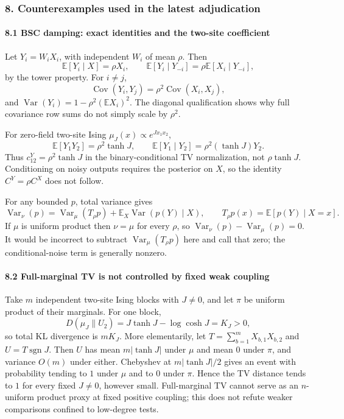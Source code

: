 \subsubsection{8. Counterexamples used in the latest adjudication}\label{counterexamples-used-in-the-latest-adjudication}

\paragraph{8.1 BSC damping: exact identities and the two-site coefficient}\label{bsc-damping-exact-identities-and-the-two-site-coefficient}

Let \(Y_i=W_iX_i\), with independent \(W_i\) of mean \(\rho\). Then
\[\mathbb E[Y_i\mid X]=\rho X_i,\qquad
\mathbb E[Y_i\mid Y_{-i}]=\rho\mathbb E[X_i\mid Y_{-i}],\]
by the tower property. For \(i\ne j\),
\[\operatorname{Cov}(Y_i,Y_j)=\rho^2\operatorname{Cov}(X_i,X_j),\]
and \(\operatorname{Var}(Y_i)=1-\rho^2(\mathbb E X_i)^2\). The diagonal qualification shows why full covariance row sums do not simply scale by \(\rho^2\).

For zero-field two-site Ising \(\mu_J(x)\propto e^{Jx_1x_2}\),
\[\mathbb E[Y_1Y_2]=\rho^2\tanh J,
\qquad \mathbb E[Y_1\mid Y_2]=\rho^2(\tanh J)Y_2.\]
Thus \(c_{12}^Y=\rho^2\tanh J\) in the binary-conditional TV normalization, not \(\rho\tanh J\). Conditioning on noisy outputs requires the posterior on \(X\), so the identity \(C^Y=\rho C^X\) does not follow.

For any bounded \(p\), total variance gives
\[\operatorname{Var}_\nu(p)=\operatorname{Var}_\mu(T_\rho p)
+\mathbb E_X\operatorname{Var}(p(Y)\mid X),\qquad T_\rho p(x)=\mathbb E[p(Y)\mid X=x].\]
If \(\mu\) is uniform product then \(\nu=\mu\) for every \(\rho\), so \(\operatorname{Var}_\nu(p)-\operatorname{Var}_\mu(p)=0\). It would be incorrect to subtract \(\operatorname{Var}_\mu(T_\rho p)\) here and call that zero; the conditional-noise term is generally nonzero.

\paragraph{8.2 Full-marginal TV is not controlled by fixed weak coupling}\label{full-marginal-tv-is-not-controlled-by-fixed-weak-coupling}

Take \(m\) independent two-site Ising blocks with \(J\ne0\), and let \(\pi\) be uniform product of their marginals. For one block,
\[D(\mu_J\|U_2)=J\tanh J-\log\cosh J=K_J>0,\]
so total KL divergence is \(mK_J\). More elementarily, let \(T=\sum_{b=1}^mX_{b,1}X_{b,2}\) and \(U=T\operatorname{sgn}J\). Then \(U\) has mean \(m|\tanh J|\) under \(\mu\) and mean \(0\) under \(\pi\), and variance \(O(m)\) under either. Chebyshev at \(m|\tanh J|/2\) gives an event with probability tending to \(1\) under \(\mu\) and to \(0\) under \(\pi\). Hence the TV distance tends to \(1\) for every fixed \(J\ne0\), however small. Full-marginal TV cannot serve as an \(n\)-uniform product proxy at fixed positive coupling; this does not refute weaker comparisons confined to low-degree tests.

